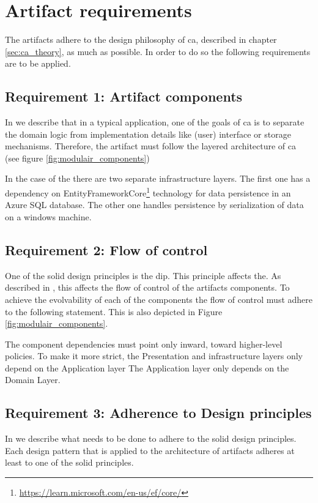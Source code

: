 \section{Artifact requirements} \label{sec:artifact_requirements}

The artifacts adhere to the design philosophy of \gls{ca}, described in chapter
\ref{sec:ca_theory}, as much as possible. In order to do so the following
requirements are to be applied.

\subsection{Requirement 1: Artifact components}
In  we describe that in a typical application, one of the goals of
\gls{ca} is to separate the domain logic from implementation details like (user) interface
or storage mechanisms. Therefore, the artifact must follow the layered architecture of
\gls{ca} (see figure \ref{fig:modulair_components})

In the case of the  there are two separate infrastructure
layers. The first one has a dependency on
EntityFrameworkCore\footnote{\url{https://learn.microsoft.com/en-us/ef/core/}} technology
for data persistence in an Azure SQL database. The other one handles persistence by
serialization of data on a windows machine.

\subsection{Requirement 2: Flow of control}
One of the \gls{solid} design principles is the \acrfull{dip}. This principle affects the.
As described in , this affects the flow of control of the
artifacts components. To achieve the evolvability of each of the components the flow of
control must adhere to the following statement. This is also depicted in Figure
\ref{fig:modulair_components}.

The component dependencies must point only inward, toward higher-level policies. To make
it more strict, the Presentation and infrastructure layers only depend on the Application
layer The Application layer only depends on the  Domain Layer.

\subsection{Requirement 3: Adherence to Design principles}
In  we describe what needs to be done to adhere to the
\gls{solid} design principles. Each design pattern that is applied to the architecture of
artifacts adheres at least to one of the \gls{solid} principles.

